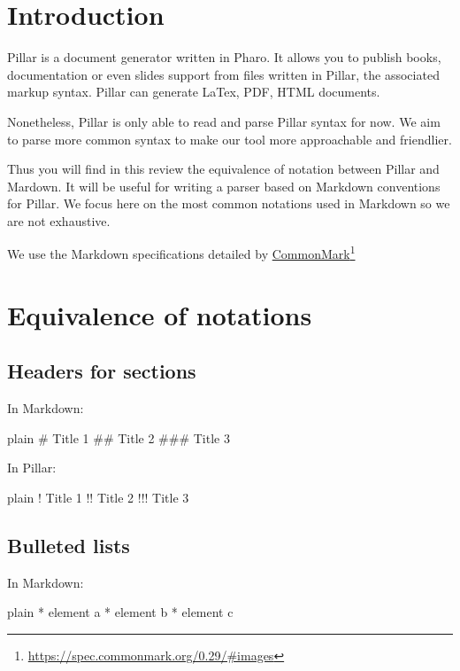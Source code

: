 \documentclass[10pt,twoside,english]{_support/latex/sbabook/sbabook}
\begin{document}
\frontmatter
\pagestyle{plain}

\tableofcontents*
\clearpage\listoffigures

\mainmatter

\chapter{Introduction}
Pillar is a document generator written in Pharo. It allows you to publish books, documentation or even slides support from files written in Pillar, the associated markup syntax. Pillar can generate LaTex, PDF, HTML documents.

Nonetheless, Pillar is only able to read and parse Pillar syntax for now. We aim to parse more common syntax to make our tool more approachable and friendlier. 

Thus you will find in this review the equivalence of notation between Pillar and Mardown. It will be useful for writing a parser based on Markdown conventions for Pillar.
We focus here on the most common notations used in Markdown so we are not exhaustive.

We use the Markdown specifications detailed by \href{https://spec.commonmark.org/0.29/#images}{CommonMark}\footnote{\url{https://spec.commonmark.org/0.29/\#images}}
\chapter{Equivalence of notations}\section{Headers for sections}
In Markdown: \textcode{\#}

\begin{displaycode}{plain}
 # Title 1
## Title 2
### Title 3
\end{displaycode}

In Pillar: \textcode{!}

\begin{displaycode}{plain}
! Title 1
!! Title 2
!!! Title 3
\end{displaycode}
\section{Bulleted lists}
In Markdown: \textcode{*}

\begin{displaycode}{plain}
* element a
* element b
* element c
\end{displaycode}
\end{document}
